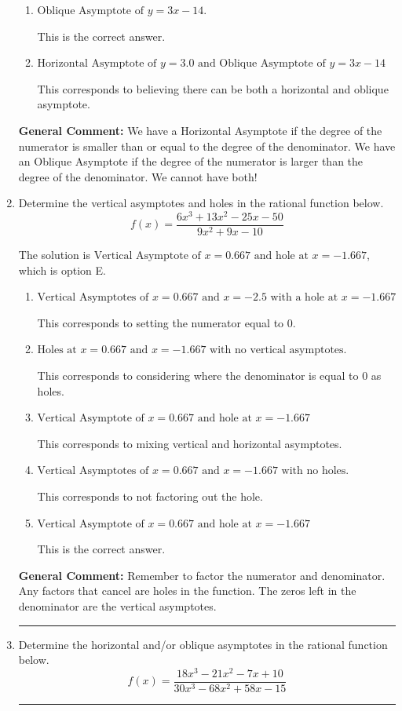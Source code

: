 \documentclass{extbook}[14pt]
\newcommand{\litem}[1]{\item #1

\rule{\textwidth}{0.4pt}}
\begin{document}
\begin{enumerate}
{\begin{enumerate}[label=\Alph*.]
This corresponds to believing there can be both a horizontal and oblique asymptote AND mixing up horizontal/vertical asymoptote.
\item \( \text{Oblique Asymptote of } y = 3x -14. \)

This is the correct answer.
\item \( \text{Horizontal Asymptote of } y = 3.0 \text{ and Oblique Asymptote of } y = 3x -14 \)

This corresponds to believing there can be both a horizontal and oblique asymptote.
\end{enumerate}

\textbf{General Comment:} We have a Horizontal Asymptote if the degree of the numerator is smaller than or equal to the degree of the denominator. We have an Oblique Asymptote if the degree of the numerator is larger than the degree of the denominator. We cannot have both!
}
\litem{
Determine the vertical asymptotes and holes in the rational function below.
\[ f(x) = \frac{6x^{3} +13 x^{2} -25 x -50}{9x^{2} +9 x -10} \]

The solution is \( \text{Vertical Asymptote of } x = 0.667 \text{ and hole at } x = -1.667 \), which is option E.\begin{enumerate}[label=\Alph*.]
\item \( \text{Vertical Asymptotes of } x = 0.667 \text{ and } x = -2.5 \text{ with a hole at } x = -1.667 \)

This corresponds to setting the numerator equal to 0.
\item \( \text{Holes at } x = 0.667 \text{ and } x = -1.667 \text{ with no vertical asymptotes.} \)

This corresponds to considering where the denominator is equal to 0 as holes.
\item \( \text{Vertical Asymptote of } x = 0.667 \text{ and hole at } x = -1.667 \)

This corresponds to mixing vertical and horizontal asymptotes.
\item \( \text{Vertical Asymptotes of } x = 0.667 \text{ and } x = -1.667 \text{ with no holes.} \)

This corresponds to not factoring out the hole.
\item \( \text{Vertical Asymptote of } x = 0.667 \text{ and hole at } x = -1.667 \)

This is the correct answer.
\end{enumerate}

\textbf{General Comment:} Remember to factor the numerator and denominator. Any factors that cancel are holes in the function. The zeros left in the denominator are the vertical asymptotes.
}
\litem{
Determine the horizontal and/or oblique asymptotes in the rational function below.
\[ f(x) = \frac{18x^{3} -21 x^{2} -7 x + 10}{30x^{3} -68 x^{2} +58 x -15} \]

}
\end{enumerate}
\end{document}

